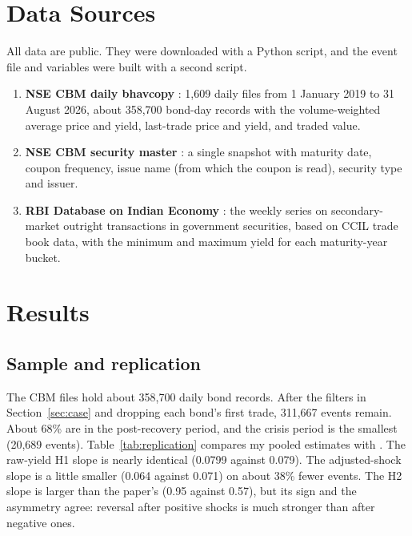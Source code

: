\documentclass[a4paper,11pt]{article}
\begin{document}
\section{Data Sources}\label{sec:sources}
All data are public. They were downloaded with a Python script, and the event file and variables were built with a second script.
\begin{enumerate}
	\item \textbf{NSE CBM daily bhavcopy} \cite{nsecbm}: 1,609 daily files from 1 January 2019 to 31 August 2026, about 358,700 bond-day records with the volume-weighted average price and yield, last-trade price and yield, and traded value.
	\item \textbf{NSE CBM security master} \cite{nsecbm}: a single snapshot with maturity date, coupon frequency, issue name (from which the coupon is read), security type and issuer.
	\item \textbf{RBI Database on Indian Economy} \cite{rbidbie}: the weekly series on secondary-market outright transactions in government securities, based on CCIL trade book data, with the minimum and maximum yield for each maturity-year bucket.
\end{enumerate}

\section{Results}
\subsection{Sample and replication}
The CBM files hold about 358,700 daily bond records. After the filters in Section~\ref{sec:case} and dropping each bond's first trade, 311,667 events remain. About 68\% are in the post-recovery period, and the crisis period is the smallest (20,689 events). Table~\ref{tab:replication} compares my pooled estimates with \cite{kumar2026delayed}. The raw-yield H1 slope is nearly identical (0.0799 against 0.079). The adjusted-shock slope is a little smaller (0.064 against 0.071) on about 38\% fewer events. The H2 slope is larger than the paper's (0.95 against 0.57), but its sign and the asymmetry agree: reversal after positive shocks is much stronger than after negative ones. 
\end{document}
